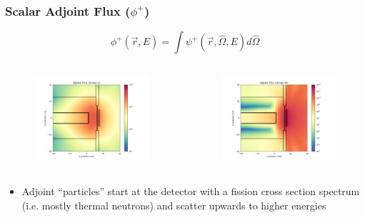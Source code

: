 \documentclass[t]{beamer}
\begin{document}
\begin{frame}
  \frametitle{Scalar Adjoint Flux ($\phi^+$)}
  \vskip-0.25in
  \begin{equation}
    \phi^+\left(\vec{r},E\right) = \int\psi^+\left(\vec{r},\hat{\Omega},E\right)d\hat{\Omega}
  \end{equation}
  \vskip-0.25in
  \begin{columns}
    \begin{figure}
      \includegraphics[trim={0.7in 0.15in 1.05in 0.4in},clip,scale=0.36]{images/scalar_flux_adj_g02.png}
    \end{figure}
    \begin{figure}
      \includegraphics[trim={0.7in 0.15in 1.05in 0.4in},clip,scale=0.36]{images/scalar_flux_adj_g26.png}
    \end{figure}
  \end{columns}
  \begin{itemize}
    \item Adjoint ``particles'' start at the detector with a fission cross
          section spectrum (i.e. mostly thermal neutrons) and scatter upwards to
          higher energies
  \end{itemize}
\end{frame}
\end{document}
